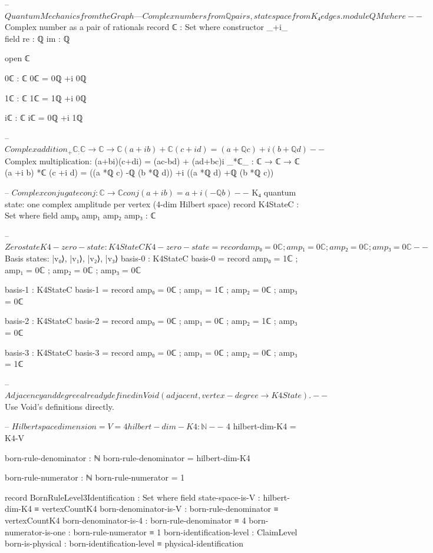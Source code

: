 \documentclass[11pt,a4paper]{book}
\begin{document}
\begin{code}
-- $ Quantum Mechanics from the Graph — Complex numbers from ℚ pairs, state space from K₄ edges.

module QM where

  -- $ Complex number as a pair of rationals
  record ℂ : Set where
    constructor _+i_
    field
      re : ℚ
      im : ℚ

  open ℂ

  0ℂ : ℂ
  0ℂ = 0ℚ +i 0ℚ

  1ℂ : ℂ
  1ℂ = 1ℚ +i 0ℚ

  iℂ : ℂ
  iℂ = 0ℚ +i 1ℚ

  -- $ Complex addition
  _+ℂ_ : ℂ → ℂ → ℂ
  (a +i b) +ℂ (c +i d) = (a +ℚ c) +i (b +ℚ d)

  -- $ Complex multiplication: (a+bi)(c+di) = (ac-bd) + (ad+bc)i
  _*ℂ_ : ℂ → ℂ → ℂ
  (a +i b) *ℂ (c +i d) = ((a *ℚ c) -ℚ (b *ℚ d)) +i ((a *ℚ d) +ℚ (b *ℚ c))

  -- $ Complex conjugate
  conj : ℂ → ℂ
  conj (a +i b) = a +i (-ℚ b)

  -- $ K₄ quantum state: one complex amplitude per vertex (4-dim Hilbert space)
  record K4StateC : Set where
    field
      amp₀ amp₁ amp₂ amp₃ : ℂ

  -- $ Zero state
  K4-zero-state : K4StateC
  K4-zero-state = record { amp₀ = 0ℂ ; amp₁ = 0ℂ ; amp₂ = 0ℂ ; amp₃ = 0ℂ }

  -- $ Basis states: |v₀⟩, |v₁⟩, |v₂⟩, |v₃⟩
  basis-0 : K4StateC
  basis-0 = record { amp₀ = 1ℂ ; amp₁ = 0ℂ ; amp₂ = 0ℂ ; amp₃ = 0ℂ }

  basis-1 : K4StateC
  basis-1 = record { amp₀ = 0ℂ ; amp₁ = 1ℂ ; amp₂ = 0ℂ ; amp₃ = 0ℂ }

  basis-2 : K4StateC
  basis-2 = record { amp₀ = 0ℂ ; amp₁ = 0ℂ ; amp₂ = 1ℂ ; amp₃ = 0ℂ }

  basis-3 : K4StateC
  basis-3 = record { amp₀ = 0ℂ ; amp₁ = 0ℂ ; amp₂ = 0ℂ ; amp₃ = 1ℂ }

-- $ Adjacency and degree already defined in Void (adjacent, vertex-degree → K4State).
-- $ Use Void's definitions directly.

-- $ Hilbert space dimension = V = 4
hilbert-dim-K4 : ℕ
-- $ 4
hilbert-dim-K4 = K4-V

born-rule-denominator : ℕ
born-rule-denominator = hilbert-dim-K4

born-rule-numerator : ℕ
born-rule-numerator = 1

record BornRuleLevel3Identification : Set where
  field
    state-space-is-V          : hilbert-dim-K4 ≡ vertexCountK4
    born-denominator-is-V     : born-rule-denominator ≡ vertexCountK4
    born-denominator-is-4     : born-rule-denominator ≡ 4
    born-numerator-is-one     : born-rule-numerator ≡ 1
    born-identification-level : ClaimLevel
    born-is-physical          : born-identification-level ≡ physical-identification


\end{code}
\end{document}
